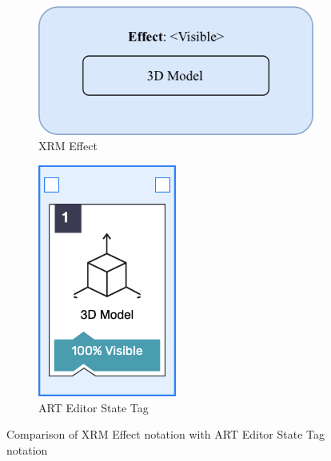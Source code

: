 \begin{figure}[h]
    \begin{subfigure}{0.5\textwidth}
        \centering
        \includegraphics[width=\columnwidth]{Figures/Editor/xrm-effect.png}
        \caption{XRM Effect}
        \label{fig:xrm-effect}
    \end{subfigure}
    \begin{subfigure}{0.45\textwidth}
        \centering
        \includegraphics[width=0.5\textwidth]{Figures/Editor/art-effect.png}
        \caption{ART Editor State Tag}
        \label{fig:art-effect}
    \end{subfigure}
    \caption{Comparison of XRM Effect notation with ART Editor State Tag notation}
    \label{fig:comparison-effect-xrm-art}
\end{figure}


